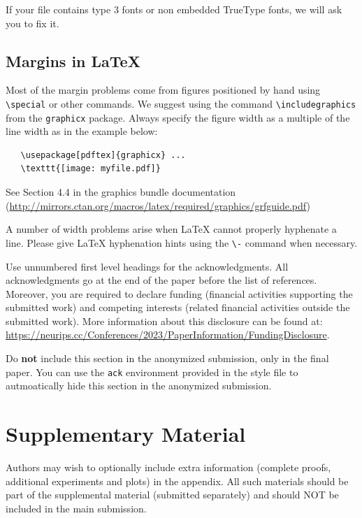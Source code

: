 \documentclass{article}
\begin{document}
If your file contains type 3 fonts or non embedded TrueType fonts, we will ask
you to fix it.


\subsection{Margins in \LaTeX{}}


Most of the margin problems come from figures positioned by hand using
\verb+\special+ or other commands. We suggest using the command
\verb+\includegraphics+ from the \verb+graphicx+ package. Always specify the
figure width as a multiple of the line width as in the example below:
\begin{verbatim}
   \usepackage[pdftex]{graphicx} ...
   \texttt{[image: myfile.pdf]}
\end{verbatim}
See Section 4.4 in the graphics bundle documentation
(\url{http://mirrors.ctan.org/macros/latex/required/graphics/grfguide.pdf})


A number of width problems arise when \LaTeX{} cannot properly hyphenate a
line. Please give LaTeX hyphenation hints using the \verb+\-+ command when
necessary.


\begin{ack}
  Use unnumbered first level headings for the acknowledgments. All acknowledgments
  go at the end of the paper before the list of references. Moreover, you are required to declare
  funding (financial activities supporting the submitted work) and competing interests (related financial activities outside the submitted work).
  More information about this disclosure can be found at: \url{https://neurips.cc/Conferences/2023/PaperInformation/FundingDisclosure}.


  Do {\bf not} include this section in the anonymized submission, only in the final paper. You can use the \texttt{ack} environment provided in the style file to autmoatically hide this section in the anonymized submission.
\end{ack}



\section{Supplementary Material}

Authors may wish to optionally include extra information (complete proofs, additional experiments and plots) in the appendix. All such materials should be part of the supplemental material (submitted separately) and should NOT be included in the main submission.
\end{document}
